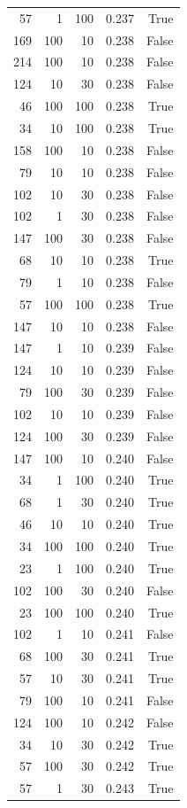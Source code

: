 \begin{tabular}{rrrrr}
57 & 1 & 100 & 0.237 & True \\
169 & 100 & 10 & 0.238 & False \\
214 & 100 & 10 & 0.238 & False \\
124 & 10 & 30 & 0.238 & False \\
46 & 100 & 100 & 0.238 & True \\
34 & 10 & 100 & 0.238 & True \\
158 & 100 & 10 & 0.238 & False \\
79 & 10 & 10 & 0.238 & False \\
102 & 10 & 30 & 0.238 & False \\
102 & 1 & 30 & 0.238 & False \\
147 & 100 & 30 & 0.238 & False \\
68 & 10 & 10 & 0.238 & True \\
79 & 1 & 10 & 0.238 & False \\
57 & 100 & 100 & 0.238 & True \\
147 & 10 & 10 & 0.238 & False \\
147 & 1 & 10 & 0.239 & False \\
124 & 10 & 10 & 0.239 & False \\
79 & 100 & 30 & 0.239 & False \\
102 & 10 & 10 & 0.239 & False \\
124 & 100 & 30 & 0.239 & False \\
147 & 100 & 10 & 0.240 & False \\
34 & 1 & 100 & 0.240 & True \\
68 & 1 & 30 & 0.240 & True \\
46 & 10 & 10 & 0.240 & True \\
34 & 100 & 100 & 0.240 & True \\
23 & 1 & 100 & 0.240 & True \\
102 & 100 & 30 & 0.240 & False \\
23 & 100 & 100 & 0.240 & True \\
102 & 1 & 10 & 0.241 & False \\
68 & 100 & 30 & 0.241 & True \\
57 & 10 & 30 & 0.241 & True \\
79 & 100 & 10 & 0.241 & False \\
124 & 100 & 10 & 0.242 & False \\
34 & 10 & 30 & 0.242 & True \\
57 & 100 & 30 & 0.242 & True \\
57 & 1 & 30 & 0.243 & True \\

\end{tabular}
